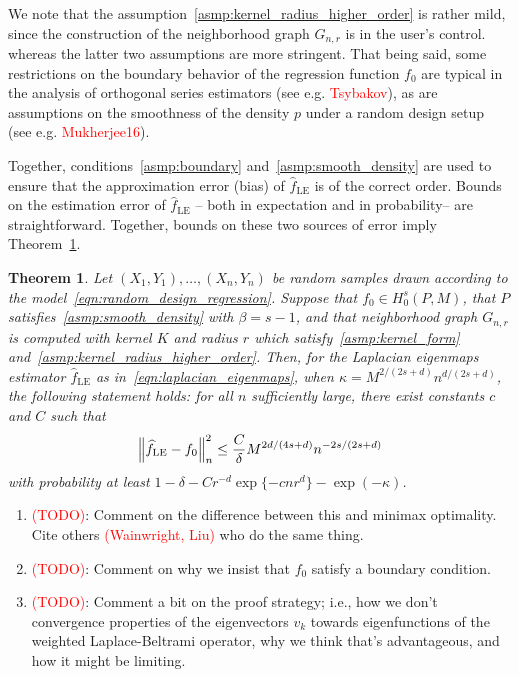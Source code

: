 \documentclass{article}
\newcommand{\1}{\mathbf{1}}
\newcommand{\wh}[1]{\widehat{#1}}
\newcommand{\LE}{\mathrm{LE}}
\theoremstyle{alden}
\theoremstyle{aldenthm}
\newtheorem{theorem}{Theorem}
\theoremstyle{definition}
\theoremstyle{remark}
\begin{document}
We note that the assumption~\ref{asmp:kernel_radius_higher_order} is rather mild, since the construction of the neighborhood graph $G_{n,r}$ is in the user's control. whereas the latter two assumptions are more stringent. That being said, some restrictions on the boundary behavior of the regression function $f_0$ are typical in the analysis of orthogonal series estimators (see e.g. \textcolor{red}{Tsybakov}), as are assumptions on the smoothness of the density $p$ under a random design setup (see e.g. \textcolor{red}{Mukherjee16}).


Together, conditions~\ref{asmp:boundary} and~\ref{asmp:smooth_density} are used to ensure that the approximation error (bias) of $\wh{f}_{\LE}$ is of the correct order. Bounds on the estimation error of $\wh{f}_{\LE}$ -- both in expectation and in probability-- are straightforward. Together, bounds on these two sources of error imply Theorem~\ref{thm:laplacian_eigenmaps_estimation}.
\begin{theorem}
	\label{thm:laplacian_eigenmaps_estimation}
	Let $(X_1,Y_1),\ldots,(X_n,Y_n)$ be random samples drawn according to the model~\eqref{eqn:random_design_regression}. Suppose that $f_0 \in H_0^s(P,M)$, that $P$ satisfies~\ref{asmp:smooth_density} with $\beta = s - 1$, and that neighborhood graph $G_{n,r}$ is computed with kernel $K$ and radius $r$ which satisfy~\ref{asmp:kernel_form} and~\ref{asmp:kernel_radius_higher_order}. Then, for the Laplacian eigenmaps estimator $\wh{f}_{\LE}$ as in~\eqref{eqn:laplacian_eigenmaps}, when $\kappa = M^{2/(2s + d)}n^{d/(2s + d)}$, the following statement holds: for all $n$ sufficiently large, there exist constants $c$ and $C$ such that
	\begin{equation*}
	\Bigl\|\wh{f}_{\LE} - f_0\Bigr\|_n^2 \leq \frac{C}{\delta} M^{2d/(4s + d)} n^{-2s/(2s + d)}
	\end{equation*}
	with probability at least $1 - \delta -  Cr^{-d}\exp\{-cnr^d\} - \exp(-\kappa)$.
\end{theorem}

\begin{enumerate}
	\item \textcolor{red}{(TODO)}: Comment on the difference between this and minimax optimality. Cite others \textcolor{red}{(Wainwright, Liu)} who do the same thing.
	\item \textcolor{red}{(TODO)}: Comment on why we insist that $f_0$ satisfy a boundary condition.
	\item \textcolor{red}{(TODO)}: Comment a bit on the proof strategy; i.e., how we don't convergence properties of the eigenvectors $v_k$ towards eigenfunctions of the weighted Laplace-Beltrami operator, why we think that's advantageous, and how it might be limiting.
\end{enumerate}
\end{document}
